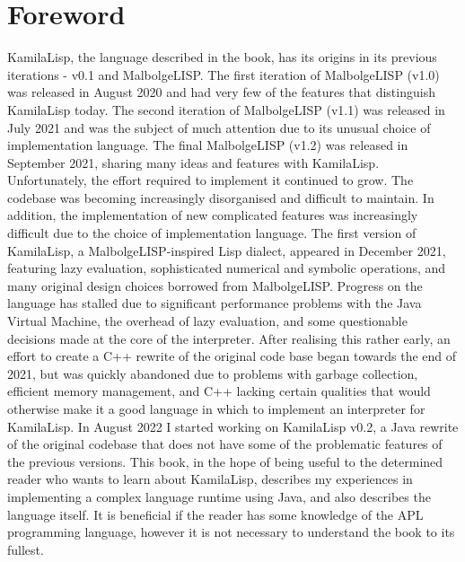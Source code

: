 
\chapter*{Foreword}
\par KamilaLisp, the language described in the book, has its origins in its previous iterations - v0.1 and MalbolgeLISP. The first iteration of MalbolgeLISP (v1.0) was released in August 2020 and had very few of the features that distinguish KamilaLisp today. The second iteration of MalbolgeLISP (v1.1) was released in July 2021 and was the subject of much attention due to its unusual choice of implementation language. The final MalbolgeLISP (v1.2) was released in September 2021, sharing many ideas and features with KamilaLisp. Unfortunately, the effort required to implement it continued to grow. The codebase was becoming increasingly disorganised and difficult to maintain. In addition, the implementation of new complicated features was increasingly difficult due to the choice of implementation language. The first version of KamilaLisp, a MalbolgeLISP-inspired Lisp dialect, appeared in December 2021, featuring lazy evaluation, sophisticated numerical and symbolic operations, and many original design choices borrowed from MalbolgeLISP. Progress on the language has stalled due to significant performance problems with the Java Virtual Machine, the overhead of lazy evaluation, and some questionable decisions made at the core of the interpreter. After realising this rather early, an effort to create a C++ rewrite of the original code base began towards the end of 2021, but was quickly abandoned due to problems with garbage collection, efficient memory management, and C++ lacking certain qualities that would otherwise make it a good language in which to implement an interpreter for KamilaLisp. In August 2022 I started working on KamilaLisp v0.2, a Java rewrite of the original codebase that does not have some of the problematic features of the previous versions. This book, in the hope of being useful to the determined reader who wants to learn about KamilaLisp, describes my experiences in implementing a complex language runtime using Java, and also describes the language itself. It is beneficial if the reader has some knowledge of the APL programming language, however it is not necessary to understand the book to its fullest.
